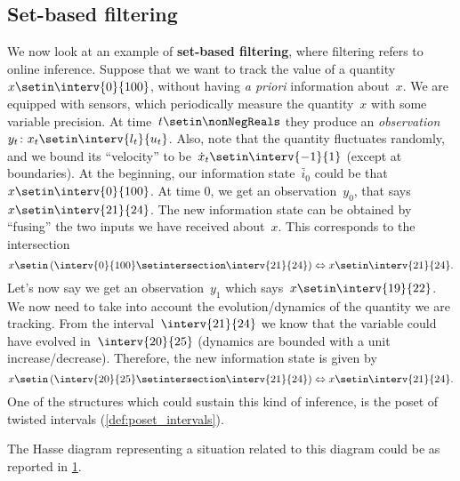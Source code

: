 \subsection{Set-based filtering}
We now look at an example of \textbf{set-based filtering}, where filtering refers to online inference.
Suppose that we want to track the value of a quantity~$x\setin \interv{0}{100}$, without having \emph{a priori} information about~$x$.
We are equipped with sensors, which periodically measure the quantity~$x$ with some variable precision.
At time~$t\setin \nonNegReals$ they produce an \emph{observation}~$y_t\colon x_t\setin \interv{l_t}{u_t}$.
Also, note that the quantity fluctuates randomly, and we bound its ``velocity'' to be~$\dot{x}_t\setin \interv{-1}{1}$ (except at boundaries).
At the beginning, our information state~$\bar{i}_0$ could be that~$x\setin \interv{0}{100}$.
At time 0, we get an observation~$y_0$, that says~$x\setin \interv{21}{24}$.
The new information state can be obtained by ``fusing'' the two inputs we have received about~$x$.
This corresponds to the intersection
\begin{equation*}
    x\setin \left( \interv{0}{100} \setintersection \interv{21}{24}\right)\Leftrightarrow x\setin \interv{21}{24}.
\end{equation*}
Let's now say we get an observation~$y_1$ which says~$x\setin \interv{19}{22}$.
We now need to take into account the evolution/dynamics of the quantity we are tracking.
From the interval~$\interv{21}{24}$ we know that the variable could have evolved in~$\interv{20}{25}$ (dynamics are bounded with a unit increase/decrease).
Therefore, the new information state is given by
\begin{equation*}
    x\setin \left( \interv{20}{25} \setintersection \interv{21}{24}\right)\Leftrightarrow x\setin \interv{21}{24}.
\end{equation*}
One of the structures which could sustain this kind of inference, is the poset of twisted intervals  (\cref{def:poset_intervals}).

The Hasse diagram representing a situation related to this diagram could be as reported in \cref{fig:hasse_filtering}.
\begin{figure}[h!]
    \centering
    \caption{}
    \label{fig:hasse_filtering}
\end{figure}

